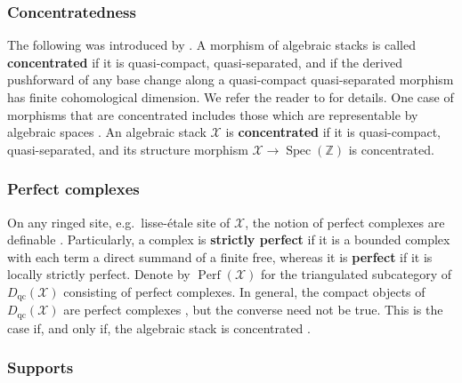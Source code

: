 \documentclass[11pt]{amsart}
\theoremstyle{plain}
\theoremstyle{definition}
\numberwithin{equation}{section}
\numberwithin{theorem}{section}
\begin{document}
\subsubsection{Concentratedness}
\label{sec:prelim_stacks_concentrated}

The following was introduced by \cite[Definition 2.4]{Hall/Rydh:2017}. 
A morphism of algebraic stacks is called \textbf{concentrated} if it is quasi-compact, quasi-separated, and if the derived pushforward of any base change along a quasi-compact quasi-separated morphism has finite cohomological dimension. 
We refer the reader to \cite[\S 2]{Hall/Rydh:2017} for details. One case of morphisms that are concentrated includes those which are representable by algebraic spaces \cite[Lemma 2.5]{Hall/Rydh:2017}. 
An algebraic stack $\mathcal{X}$ is \textbf{concentrated} if it is quasi-compact, quasi-separated, and its structure morphism $\mathcal{X} \to \operatorname{Spec}(\mathbb{Z})$ is concentrated.

\subsubsection{Perfect complexes}
\label{sec:prelim_stacks_perfects}

On any ringed site, e.g.\ lisse-\'{e}tale site of $\mathcal{X}$, the notion of perfect complexes are definable \cite[\href{https://stacks.math.columbia.edu/tag/08G4}{Tag 08G4}]{stacks-project}. 
Particularly, a complex is \textbf{strictly perfect} if it is a bounded complex with each term a direct summand of a finite free, whereas it is \textbf{perfect} if it is locally strictly perfect. 
Denote by $\operatorname{Perf}(\mathcal{X})$ for the triangulated subcategory of $D_{\operatorname{qc}}(\mathcal{X})$ consisting of perfect complexes. 
In general, the compact objects of $D_{\operatorname{qc}}(\mathcal{X})$ are perfect complexes \cite[Lemma 4.4]{Hall/Rydh:2017}, but the converse need not be true. 
This is the case if, and only if, the algebraic stack is concentrated \cite[Remark 4.6]{Hall/Rydh:2017}.

\subsubsection{Supports}
\label{sec:prelim_stacks_supports}
\end{document}
